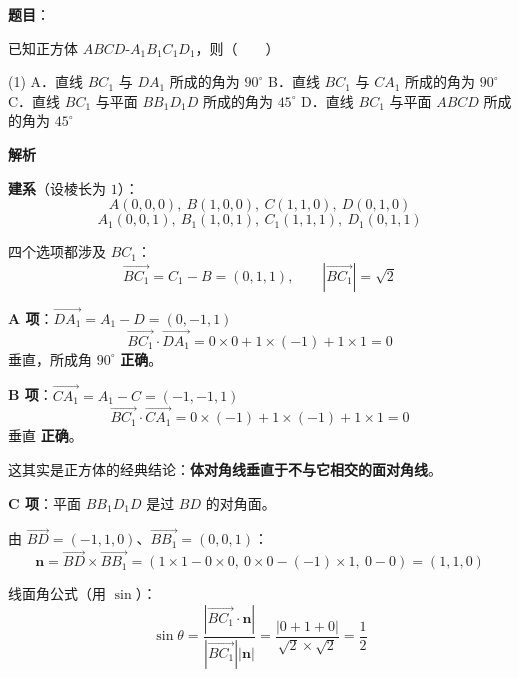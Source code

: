 \begin{answer}

\textbf{题目}：

已知正方体 $ABCD\text{-}A_1B_1C_1D_1$，则\mbox{（　　）}

\begin{gkopts}(1)
\task A．直线 $BC_1$ 与 $DA_1$ 所成的角为 $90^\circ$
\task B．直线 $BC_1$ 与 $CA_1$ 所成的角为 $90^\circ$
\task C．直线 $BC_1$ 与平面 $BB_1D_1D$ 所成的角为 $45^\circ$
\task D．直线 $BC_1$ 与平面 $ABCD$ 所成的角为 $45^\circ$
\end{gkopts}

\textbf{解析}

\textbf{建系}（设棱长为 $1$）：
\nopagebreak[4]
\[A(0,0,0),\ B(1,0,0),\ C(1,1,0),\ D(0,1,0)\]
\nopagebreak[4]
\[A_1(0,0,1),\ B_1(1,0,1),\ C_1(1,1,1),\ D_1(0,1,1)\]

四个选项都涉及 $BC_1$：
\nopagebreak[4]
\[\overrightarrow{BC_1}=C_1-B=(0,1,1),\qquad \left|\overrightarrow{BC_1}\right|=\sqrt2\]

\par\medskip

\textbf{A 项}：$\overrightarrow{DA_1}=A_1-D=(0,-1,1)$
\nopagebreak[4]
\[\overrightarrow{BC_1}\cdot\overrightarrow{DA_1}=0\times0+1\times(-1)+1\times1=0\]
垂直，所成角 $90^\circ$  \textbf{正确}。

\par\medskip

\textbf{B 项}：$\overrightarrow{CA_1}=A_1-C=(-1,-1,1)$
\nopagebreak[4]
\[\overrightarrow{BC_1}\cdot\overrightarrow{CA_1}=0\times(-1)+1\times(-1)+1\times1=0\]
垂直  \textbf{正确}。

\begin{gktip}
这其实是正方体的经典结论：\textbf{体对角线垂直于不与它相交的面对角线}。
\end{gktip}

\par\medskip

\textbf{C 项}：平面 $BB_1D_1D$ 是过 $BD$ 的对角面。

由 $\overrightarrow{BD}=(-1,1,0)$、$\overrightarrow{BB_1}=(0,0,1)$：
\nopagebreak[4]
\[\boldsymbol n=\overrightarrow{BD}\times\overrightarrow{BB_1}=(1\times1-0\times0,\ 0\times0-(-1)\times1,\ 0-0)=(1,1,0)\]

线面角公式（用 $\sin$）：
\nopagebreak[4]
\[\sin\theta=\frac{\left|\overrightarrow{BC_1}\cdot\boldsymbol n\right|}{\left|\overrightarrow{BC_1}\right|\left|\boldsymbol n\right|}=\frac{|0+1+0|}{\sqrt2\times\sqrt2}=\frac12\]


\end{answer}
